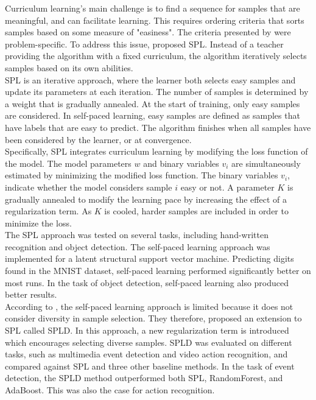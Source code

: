 Curriculum learning's main challenge is to find a sequence for samples that are meaningful, and can facilitate learning. This requires ordering criteria that sorts samples based on some measure of "easiness". The criteria presented by \cite{Bengio_curriculumlearning} were problem-specific. To address this issue, \cite{Kumar_self_paced_learning} proposed \ac{SPL}. Instead of a teacher providing the algorithm with a fixed curriculum, the algorithm iteratively selects samples based on its own abilities. \\

\ac{SPL} is an iterative approach, where the learner both selects easy samples and update its parameters at each iteration. The number of samples is determined by a weight that is gradually annealed. At the start of training, only easy samples are considered. In self-paced learning, easy samples are defined as samples that have labels that are easy to predict.
The algorithm finishes when all samples have been considered by the learner, or at convergence.\\

Specifically, \ac{SPL} integrates curriculum learning by modifying the loss function of the model. The model parameters $w$ and binary variables $v_{i}$ are simultaneously estimated by minimizing the modified loss function. The binary variables $v_{i}$, indicate whether the model considers sample $i$ easy or not.  A parameter $K$ is gradually annealed to modify the learning pace by increasing the effect of a regularization term. As $K$ is cooled, harder samples are included in order to minimize the loss. \\

The \ac{SPL} approach was tested on several tasks, including hand-written recognition and object detection. The self-paced learning approach was implemented for a latent structural support vector machine. Predicting digits found in the MNIST dataset, self-paced learning performed significantly better on most runs. In the task of object detection, self-paced learning also produced better results.  \\

According to \cite{Lu_self-paced_learning_diversity}, the self-paced learning approach is limited because it does not consider diversity in sample selection. They therefore, proposed an extension to \ac{SPL} called \ac{SPLD}. In this approach, a new regularization term is introduced which encourages selecting diverse samples. \ac{SPLD} was evaluated on different tasks, such as multimedia event detection and video action recognition, and compared against \ac{SPL} and three other baseline methods. In the task of event detection, the \ac{SPLD} method outperformed both \ac{SPL}, RandomForest, and AdaBoost. This was also the case for action recognition.\\

